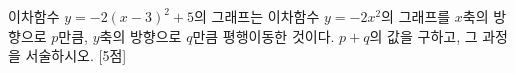 이차함수 $y=-2(x-3)^2+5$의 그래프는 이차함수 $y=-2x^2$의 그래프를 $x$축의 방향으로 $p$만큼, $y$축의 방향으로 $q$만큼 평행이동한 것이다. $p+q$의 값을 구하고, 그 과정을 서술하시오. \mbox{[5점]}
